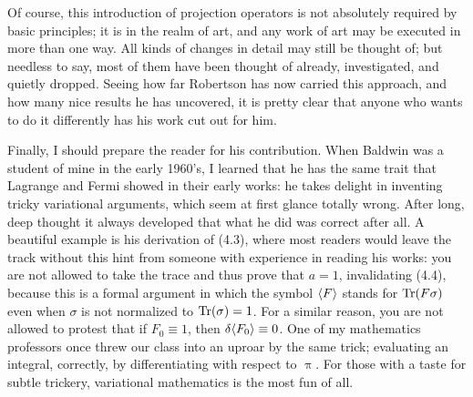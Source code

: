 Of course, this introduction of projection operators is not absolutely required by basic principles; it is in the realm of art, and any work of art may be executed in more than one way.
All kinds of changes in detail may still be thought of; but needless to say, most of them have been thought of already, investigated, and quietly dropped.
Seeing how far Robertson has now carried this approach, and how many nice results he has uncovered, it is pretty clear that anyone who wants to do it differently has his work cut out for him.

Finally, I should prepare the reader for his contribution.
When Baldwin was a student of mine in the early 1960's, I learned that he has the same trait that Lagrange and Fermi showed in their early works: he takes delight in inventing tricky variational arguments, which seem at first glance totally wrong.
After long, deep thought it always developed that what he did was correct after all.
A beautiful example is his derivation of (4.3), where most readers would leave the track without this hint from someone with experience in reading his works: you are not allowed to take the trace and thus prove that $a=1$, invalidating (4.4), because this is a formal argument in which the symbol $\langle F\rangle$ stands for $\operatorname{Tr}(F\sigma)$ even when $\sigma$ is not
normalized to $\operatorname{Tr}(\sigma) = 1$.
For a similar reason, you are not allowed to protest that if $F_0 \equiv 1$, then $\mathop{}\!\delta \langle F_0\rangle \equiv 0$.
One of my mathematics professors once threw our class into an uproar by the same trick; evaluating an integral, correctly, by differentiating with respect to $\uppi$.
For those with a taste for subtle trickery, variational mathematics is the most fun of all.